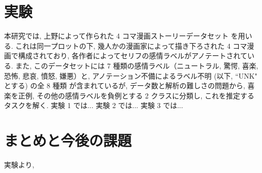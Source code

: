 \documentclass[a4paper,twoside,twocolumn,10pt]{jarticle}     %
\begin{document}
\section{実験}
本研究では, 上野によって作られた 4 コマ漫画ストーリーデータセット \cite{ueno_miki2018} を用いる.
これは同一プロットの下, 幾人かの漫画家によって描き下ろされた 4 コマ漫画で構成されており, 各作者によってセリフの感情ラベルがアノテートされている. また, このデータセットには 7 種類の感情ラベル（ニュートラル, 驚愕, 喜楽, 恐怖, 悲哀, 憤怒, 嫌悪）と, アノテーション不備によるラベル不明 (以下, ``UNK" とする) の全 8 種類
が含まれているが, データ数と解析の難しさの問題から, 喜楽を正例, その他の感情ラベルを負例とする 2 クラスに分類し, これを推定するタスクを解く.
実験 1 では...
実験 2 では...
実験 3 では...
\section{まとめと今後の課題}
実験より,



\end{document}
